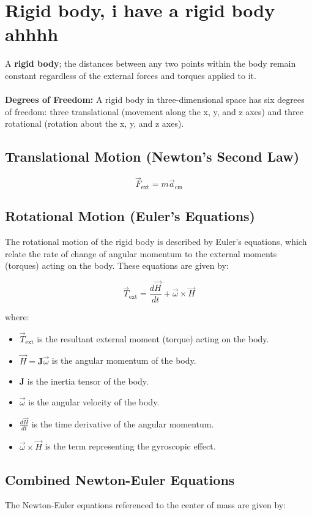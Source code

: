 \section{Rigid body, i have a rigid body ahhhh}
A \textbf{rigid body}; the distances between any two points within the body remain constant regardless of the external forces and torques applied to it.
\\
\\
\textbf{Degrees of Freedom:} A rigid body in three-dimensional space has six degrees of freedom: three translational (movement along the x, y, and z axes) and three rotational (rotation about the x, y, and z axes).

\subsection{Translational Motion (Newton's Second Law)}
\[
\vec{F}_{\text{ext}} = m \vec{a}_{\text{cm}}
\]

\subsection{Rotational Motion (Euler's Equations)}

The rotational motion of the rigid body is described by Euler's equations, which relate the rate of change of angular momentum to the external moments (torques) acting on the body. These equations are given by:

\[
\vec{T}_{\text{ext}} = \frac{d \vec{H}}{dt} + \vec{\omega} \times \vec{H}
\]

where:
\begin{itemize}
    \item \( \vec{T}_{\text{ext}} \) is the resultant external moment (torque) acting on the body.
    \item \( \vec{H} = \mathbf{J} \vec{\omega} \) is the angular momentum of the body.
    \item \( \mathbf{J} \) is the inertia tensor of the body.
    \item \( \vec{\omega} \) is the angular velocity of the body.
    \item \( \frac{d \vec{H}}{dt} \) is the time derivative of the angular momentum.
    \item \( \vec{\omega} \times \vec{H} \) is the term representing the gyroscopic effect.
\end{itemize}

\subsection{Combined Newton-Euler Equations}
The Newton-Euler equations referenced to the center of mass are given by:

